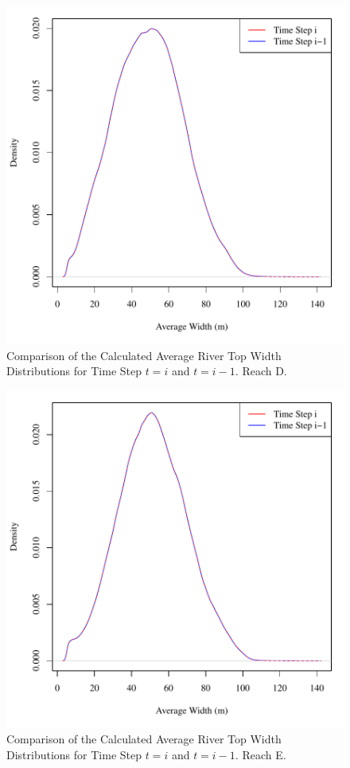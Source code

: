 \begin{figure}[htbp]
\begin{center}
	\includegraphics[width=6in]{"Figures/Results_USR/G widthToday D"}
	\caption{Comparison of the Calculated Average River Top Width Distributions for Time Step $t=i$ and $t=i-1$.  Reach D.}
\end{center}
\end{figure}

\begin{figure}[htbp]
\begin{center}
	\includegraphics[width=6in]{"Figures/Results_USR/G widthToday E"}
	\caption{Comparison of the Calculated Average River Top Width Distributions for Time Step $t=i$ and $t=i-1$.  Reach E.}
\end{center}
\end{figure}

